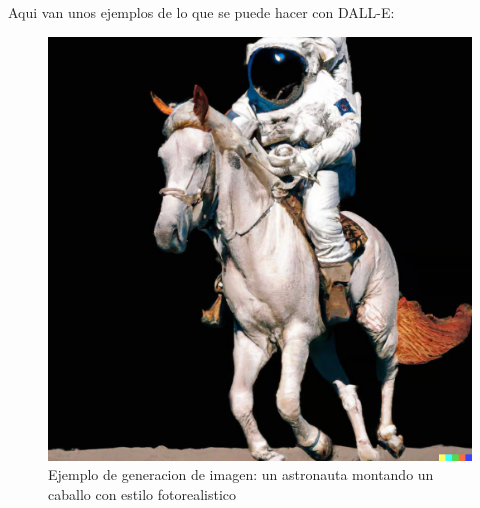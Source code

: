 \documentclass[runningheads]{llncs} %
\begin{document}
Aqui van unos ejemplos de lo que se puede hacer con DALL-E:

\begin{figure}
    \centering
    \includegraphics[scale=0.19]{ej1-dalle.jpg}
    \caption{Ejemplo de generacion de imagen: un astronauta montando un
    caballo con estilo fotorealistico \cite{ej-dalle}}
    \label{fig:dalle-ej1}
\end{figure}
\end{document}
